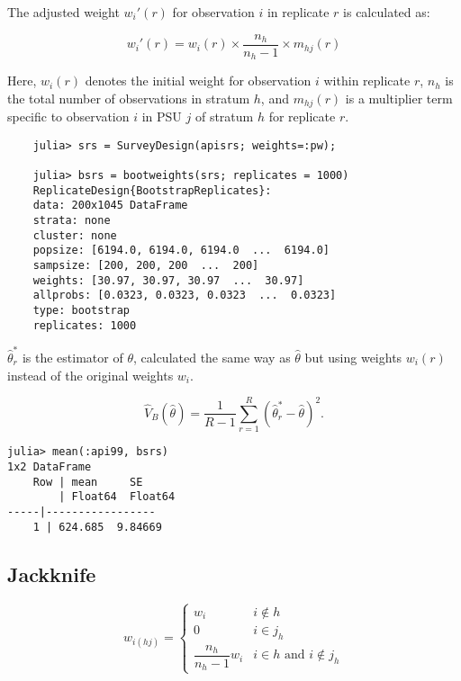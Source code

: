 \documentclass{juliacon}
\begin{document}
The adjusted weight $w_i'(r)$ for observation $i$ in replicate $r$ is calculated as:

\begin{equation}
    w_i'(r) = w_i(r) \times \frac{n_h}{n_h - 1} \times m_{hj}(r)
\end{equation}

Here, $w_i(r)$ denotes the initial weight for observation $i$ within replicate $r$, $n_h$ is the total number of observations in stratum $h$, and $m_{hj}(r)$ is a multiplier term specific to observation $i$ in PSU $j$ of stratum $h$ for replicate $r$.

\begin{lstlisting}
    julia> srs = SurveyDesign(apisrs; weights=:pw);
    
    julia> bsrs = bootweights(srs; replicates = 1000)
    ReplicateDesign{BootstrapReplicates}:
    data: 200x1045 DataFrame
    strata: none
    cluster: none
    popsize: [6194.0, 6194.0, 6194.0  ...  6194.0]
    sampsize: [200, 200, 200  ...  200]
    weights: [30.97, 30.97, 30.97  ...  30.97]
    allprobs: [0.0323, 0.0323, 0.0323  ...  0.0323]
    type: bootstrap
    replicates: 1000
\end{lstlisting}

$\hat{\theta}^*_r$ is the estimator of $\theta$, calculated the same way as $\hat{\theta}$ but using weights $w_i(r)$ instead of the original weights $w_i$. 

\begin{equation}
        \hat{V}_B(\hat{\theta}) = \dfrac{1}{R-1}\sum_{r=1}^{R} (\hat{\theta}^*_r - \hat{\theta})^2.
\end{equation}

\begin{lstlisting}
julia> mean(:api99, bsrs)
1x2 DataFrame
    Row | mean     SE      
        | Float64  Float64 
-----|-----------------
    1 | 624.685  9.84669
\end{lstlisting}

\subsection{Jackknife}

\begin{equation}
    w_{i(hj)} = \begin{cases}
        w_i & i \notin h\\
    0 & i \in j_{h} \\
    \dfrac{n_h}{n_h - 1} w_i &  i \in h \text{ and } i \notin j_{h}
    \end{cases}
    \end{equation} \cite{jackknifeLohr}
\end{document}
